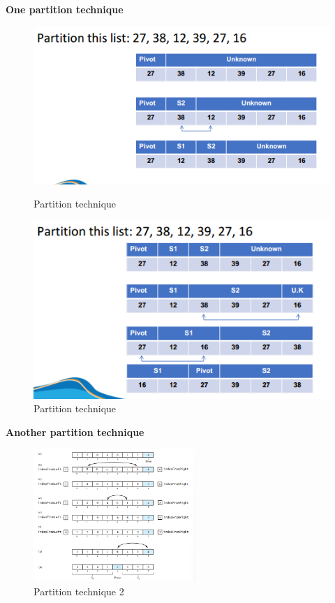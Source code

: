 \textbf{One partition technique} ~\cite{ref1}
\begin{figure}[h]
\centering
\begin{minipage}{0.45\textwidth}
    \centering
    \includegraphics[scale=0.6]{Figures/sort_demo/quick_1.png}
    \caption{Partition technique}
    \label{fig:before_undo}
\end{minipage}\hfill
\begin{minipage}{0.45\textwidth}
    \centering
    \includegraphics[scale=0.6]{Figures/sort_demo/quick_2.png}
    \caption{Partition technique}
    \label{fig:after_undo}
\end{minipage}
\end{figure}


\vspace{10pt}

\textbf{Another partition technique} ~\cite{ref7} 
\begin{figure}[h]
    \centering
    \includegraphics[width=0.55\textwidth]{Figures/sort_demo/quick_3.png}
    \caption{Partition technique 2}
    \label{fig:enter-label}
\end{figure}

